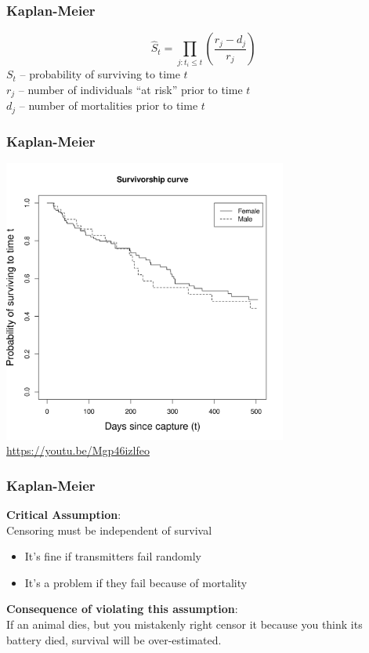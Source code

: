 \documentclass[color=usenames,dvipsnames]{beamer}\usepackage[]{graphicx}\usepackage[]{color}
\begin{document}
\begin{frame}
  \frametitle{Kaplan-Meier}
  \LARGE
  \[
    \hat{S}_t = \prod_{j: t_i \le t}\left(\frac{r_j - d_j}{r_j}\right)
  \]
  \large
  $S_t$ -- probability of surviving to time $t$ \\
  $r_j$ -- number of individuals ``at risk'' prior to time $t$ \\
  $d_j$ -- number of mortalities prior to time $t$
\end{frame}



\begin{frame}
  \frametitle{Kaplan-Meier}
  \begin{center}
    \includegraphics[width=0.70\textwidth]{deerSurv/deerSurvSex} \\
    \color{blue} 
    \url{
      https://youtu.be/Mgp46izlfeo
    }
  \end{center}
\end{frame}




\begin{frame}
  \frametitle{Kaplan-Meier}
  \large
  {\bf Critical Assumption}: \\
  Censoring must be independent of survival \\
 \begin{itemize}
   \item It's fine if transmitters fail randomly
   \item It's a problem if they fail because of mortality
 \end{itemize}
  \pause
  \vfill
%  
  {\bf Consequence of violating this assumption}: \\
  If an animal dies, but you mistakenly right censor it because you
  think its battery died, survival will be over-estimated.  
\end{frame}
\end{document}
